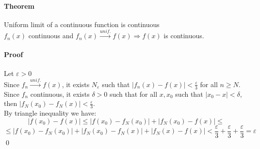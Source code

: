 \documentclass{article}
\newcommand{\abs}[1]{\left|#1\right|}
\newcommand{\tounif}{\xrightarrow{unif.}}
\newcommand{\Ep}{\varepsilon}
\newcommand{\Theorem}{\paragraph{Theorem}}
\newcommand{\Proof}{\paragraph{Proof}}
\begin{document}
  \Theorem Uniform limit of a continuous function is continuous
\\$f_n(x)$ continuous and $f_n(x) \tounif f(x) \Rightarrow f(x)$ is continuous.

  \Proof Let $\Ep > 0$
\\Since $f_n \tounif f(x)$, it exists $N_\Ep$ such that $\abs{f_n(x)-f(x)} <
  \frac{\Ep}{3}$ for all $n \geq N$.
\\Since $f_n$ continuous, it exists $\delta > 0$ such that for all $x,x_0$ such
  that $\abs{x_0 - x} < \delta$, then $\abs{f_N(x_0) - f_N(x)} < \frac{\Ep}{3}$.
\\By triangle inequality we have:
\begin{equation*}
  \abs{f(x_0) - f(x)} \leq \abs{f(x_0) - f_N(x_0)} + \abs{f_N(x_0) - f(x)} \leq
\end{equation*}
\begin{equation*} \leq
  \abs{f(x_0) - f_N(x_0)} + \abs{f_N(x_0) - f_N(x)} + \abs{f_N(x) - f(x)} <
  \frac{\Ep}{3} + \frac{\Ep}{3} + \frac{\Ep}{3} = \Ep
\end{equation*}
  \qed
\end{document}
